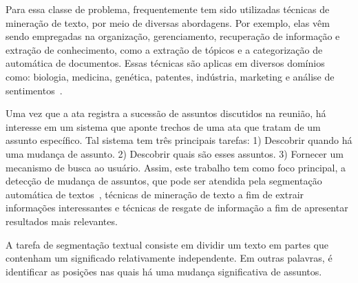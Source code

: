 
Para essa classe de problema, frequentemente tem sido utilizadas técnicas de mineração de texto, por meio de diversas abordagens. Por exemplo, elas  vêm sendo empregadas na organização, gerenciamento, recuperação de informação e extração de conhecimento, como a extração de tópicos e a categorização de automática de documentos. Essas técnicas são aplicas em diversos domínios como: biologia, medicina, genética, patentes, indústria, marketing e análise de sentimentos~\cite{Hashimi2015729}. %









Uma vez que a ata registra a sucessão de assuntos discutidos na reunião, há interesse em um sistema que aponte trechos de uma ata que tratam de um assunto específico. Tal sistema tem três principais tarefas: 1) Descobrir quando há uma mudança de assunto. 2) Descobrir quais são esses assuntos. 3) Fornecer um mecanismo de busca ao usuário. Assim, este trabalho tem como foco principal, a detecção de mudança de assuntos, que pode ser atendida pela segmentação automática de textos~\cite{Chen2017,Naili2016,Cardoso2017}, técnicas de mineração de texto a fim de extrair informações interessantes e técnicas de resgate de informação a fim de apresentar resultados mais relevantes. 








A tarefa de segmentação textual consiste em dividir um texto em partes que contenham um significado relativamente independente. Em outras palavras, é identificar as posições nas quais há uma mudança significativa de assuntos. 

